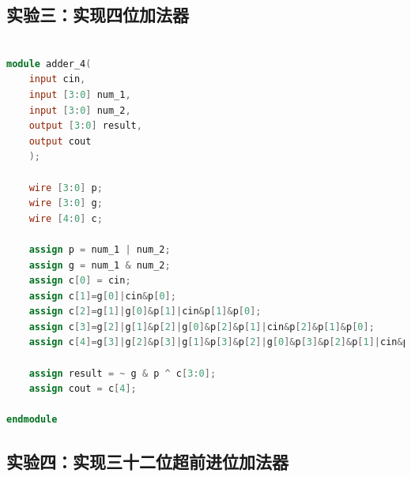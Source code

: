 \documentclass[zihao=5, UTF8]{article}
\theoremstyle{MyLineTheoremStyle} %
\theoremstyle{MyBlockTheoremStyle} %
\theoremstyle{MySubsubsectionStyle} %
\begin{document}
\subsection{实验三：实现四位加法器}
\begin{lstlisting}[language=Verilog]

module adder_4(
    input cin,
    input [3:0] num_1,
    input [3:0] num_2,
    output [3:0] result,
    output cout
    );

    wire [3:0] p;
    wire [3:0] g;
    wire [4:0] c;

    assign p = num_1 | num_2;
    assign g = num_1 & num_2;
    assign c[0] = cin; 
  	assign c[1]=g[0]|cin&p[0];
  	assign c[2]=g[1]|g[0]&p[1]|cin&p[1]&p[0];
  	assign c[3]=g[2]|g[1]&p[2]|g[0]&p[2]&p[1]|cin&p[2]&p[1]&p[0];
  	assign c[4]=g[3]|g[2]&p[3]|g[1]&p[3]&p[2]|g[0]&p[3]&p[2]&p[1]|cin&p[3]&p[2]&p[1]&p[0];
    
    assign result = ~ g & p ^ c[3:0];
    assign cout = c[4];

endmodule

\end{lstlisting}

\subsection{实验四：实现三十二位超前进位加法器}
\end{document}
